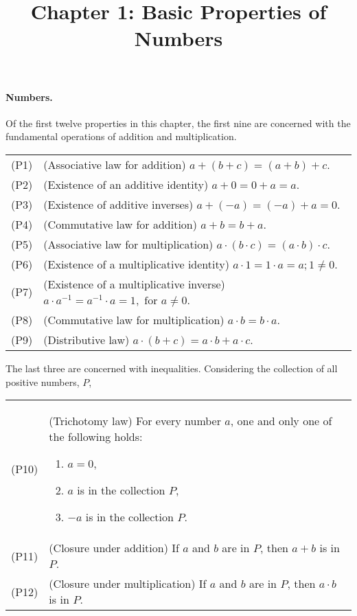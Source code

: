 \documentclass{article}
\begin{document}
\title{Chapter 1: Basic Properties of Numbers}
\maketitle

\paragraph{Numbers.} Of the first twelve properties in this chapter, the first
nine are concerned with the fundamental operations of addition and
multiplication.

\begin{tabular}{l p{4in}}
  (P1) & (Associative law for addition) $a + (b + c) = (a + b) + c$. \\
  (P2) & (Existence of an additive identity) $a + 0 = 0 + a = a$. \\
  (P3) & (Existence of additive inverses) $a + (-a) = (-a) + a = 0$. \\
  (P4) & (Commutative law for addition) $a + b = b + a$. \\
  (P5) & (Associative law for multiplication) $a \cdot (b \cdot c) = (a \cdot
    b) \cdot c$. \\
  (P6) & (Existence of a multiplicative identity) $a \cdot 1 = 1 \cdot a = a; 1
    \neq 0$. \\
  (P7) & (Existence of a multiplicative inverse) $a \cdot a^{-1} = a^{-1} \cdot
    a = 1, \text{ for } a \neq 0$. \\
  (P8) & (Commutative law for multiplication) $a \cdot b = b \cdot a$. \\
  (P9) & (Distributive law) $a \cdot (b + c) = a \cdot b + a \cdot c$.
\end{tabular}

The last three are concerned with inequalities. Considering the collection of
all positive numbers, $P$,

\begin{tabular}{l p{4in}}
  (P10) & (Trichotomy law) For every number $a$, one and only one of the
    following holds: \begin{enumerate}
      \itemsep0em
      \item $a = 0$,
      \item $a$ is in the collection $P$,
      \item $-a$ is in the collection $P$.
    \end{enumerate} \\
  (P11) & (Closure under addition) If $a$ and $b$ are in $P$, then $a + b$ is
    in $P$. \\
  (P12) & (Closure under multiplication) If $a$ and $b$ are in $P$, then $a
    \cdot b$ is in $P$.
\end{tabular}
\end{document}
